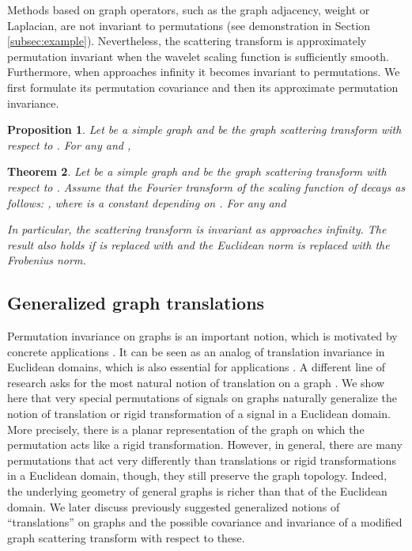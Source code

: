 \documentclass{article}
\newtheorem{theorem}{Theorem}[section]
\newtheorem{proposition}[theorem]{Proposition}
\begin{document}
Methods based on graph operators, such as the graph adjacency, weight or Laplacian, are not invariant 
to permutations (see demonstration in Section \ref{subsec:example}). Nevertheless, the scattering transform is approximately permutation invariant when the wavelet scaling function is sufficiently smooth. Furthermore, when  approaches infinity it becomes invariant to permutations. We first formulate its permutation covariance and then its approximate permutation invariance.

\begin{proposition}\label{prop:permCov}
Let  be a simple graph and  be the graph scattering transform with respect to . For any  and , 

\end{proposition}







\begin{theorem}\label{thm:transinv}
Let  be a simple graph and  be the graph scattering transform with respect to . Assume that the Fourier transform of the scaling function  of  decays as follows: , where  is a constant depending on . For any  and 

In particular, the scattering transform is invariant as  approaches infinity.
The result also holds if  is replaced with  and the Euclidean norm is replaced with the Frobenius norm.
\end{theorem}



\subsection{Generalized graph translations}\label{subsec:graphtranslation}

{Permutation invariance on graphs is an important notion, which is motivated by concrete applications \cite{GutVW16,DuvMI15}. It can be seen as an analog of translation invariance in Euclidean domains, which is also essential for applications \cite{Mal13, GooBC16}.} {A different line of research asks for the most natural notion of translation on a graph \cite{ShuRV16, SanM13}. We show here that very special permutations of signals on graphs naturally generalize the notion of translation or rigid transformation of a signal in a Euclidean domain. More precisely, there is a planar representation of the graph on which the permutation acts like a rigid transformation. However, in general, there are many permutations that act very differently than translations or rigid transformations in a Euclidean domain, though, they still preserve the graph topology. Indeed, the underlying geometry of general graphs is richer than that of the Euclidean domain.} 
We later discuss {previously suggested} generalized notions of ``translations'' on graphs and the possible covariance and invariance of a modified graph scattering transform with respect to these.  
\end{document}
